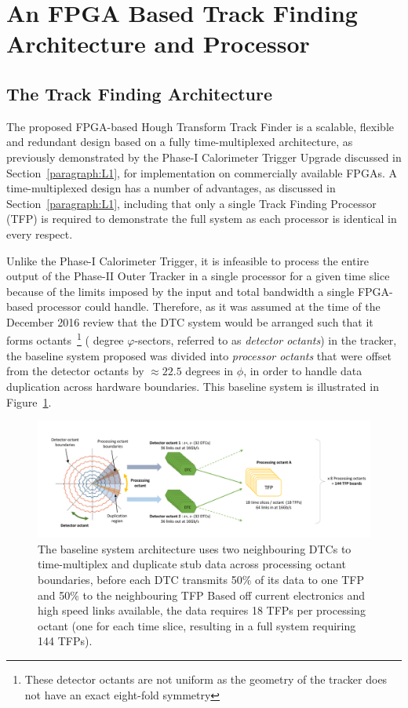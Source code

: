 \section{An FPGA Based Track Finding Architecture and Processor}\label{sec:TMTT}
\subsection{The Track Finding Architecture}\label{subsec:TFA}
The proposed FPGA-based Hough Transform Track Finder is a scalable, flexible and redundant design based on a fully time-multiplexed architecture, as previously demonstrated by the Phase-I Calorimeter Trigger Upgrade discussed in Section~\ref{paragraph:L1}, for implementation on commercially available FPGAs.
A time-multiplexed design has a number of advantages, as discussed in Section~\ref{paragraph:L1}, including that only a single Track Finding Processor (TFP) is required to demonstrate the full system as each processor is identical in every respect.

Unlike the Phase-I Calorimeter Trigger, it is infeasible to process the entire output of the Phase-II Outer Tracker in a single processor for a given time slice because of the limits imposed by the input and total bandwidth a single FPGA-based processor could handle.
Therefore, as it was assumed at the time of the December 2016 review that the DTC system would be arranged such that it forms octants~\footnote{These detector octants are not uniform as the geometry of the tracker does not have an exact eight-fold symmetry} ( degree $\varphi$-sectors, referred to as \emph {detector octants}) in the tracker, the baseline system proposed was divided into \emph{processor octants} that were offset from the detector octants by $\approx 22.5$ degrees in $\phi$, in order to handle data duplication across hardware boundaries.
This baseline system is illustrated in Figure~\ref{fig:tmttarch}.

\begin{figure}[t]
\centering
\includegraphics[width=1.00\textwidth]{figs/tk-upgrade/tmttarch.pdf}
\caption{The baseline system architecture uses two neighbouring DTCs to time-multiplex and duplicate stub data across processing octant boundaries, before each DTC transmits 50\% of its data to one TFP and 50\% to the neighbouring TFP Based off current electronics and high speed links available, the data requires 18 TFPs per processing octant (one for each time slice, resulting in a full system requiring 144 TFPs).}
\label{fig:tmttarch}
\end{figure}


